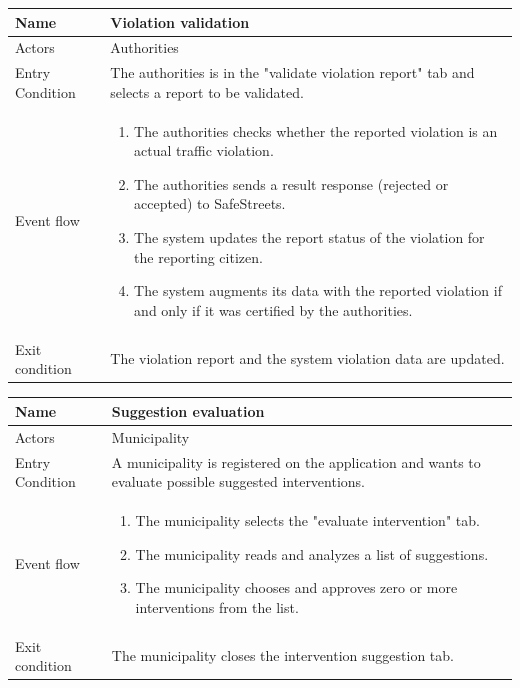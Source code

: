 \vskip 0.2in
\begin{tabular}{|p{3.1cm}|p{11.6cm}|}
\hline
Name & Violation validation\\
\hline
Actors & Authorities\\
\hline
Entry Condition & The authorities is in the "validate violation report" tab and selects a report to be validated.\\
\hline
Event flow & \begin{enumerate}
                \item The authorities checks whether the reported violation is an actual traffic violation.
                \item The authorities sends a result response (rejected or accepted) to SafeStreets.
                \item The system updates the report status of the violation for the reporting citizen.
                \item The system augments its data with the reported violation if and only if it was certified by the authorities.
            \end{enumerate}\\
\hline
Exit condition & The violation report and the system violation data are updated.\\
\hline
\end{tabular}

\vskip 0.2in
\begin{tabular}{|p{3.1cm}|p{11.6cm}|}
\hline
Name & Suggestion evaluation\\
\hline
Actors & Municipality\\
\hline
Entry Condition & A municipality is registered on the application and wants to evaluate possible suggested interventions.\\
\hline
Event flow & \begin{enumerate}
			\item The municipality selects the "evaluate intervention" tab.
			\item The municipality reads and analyzes a list of suggestions.
			\item The municipality chooses and approves zero or more interventions from the list.
            \end{enumerate}\\
\hline
Exit condition & The municipality closes the intervention suggestion tab.\\
\hline
\end{tabular}

